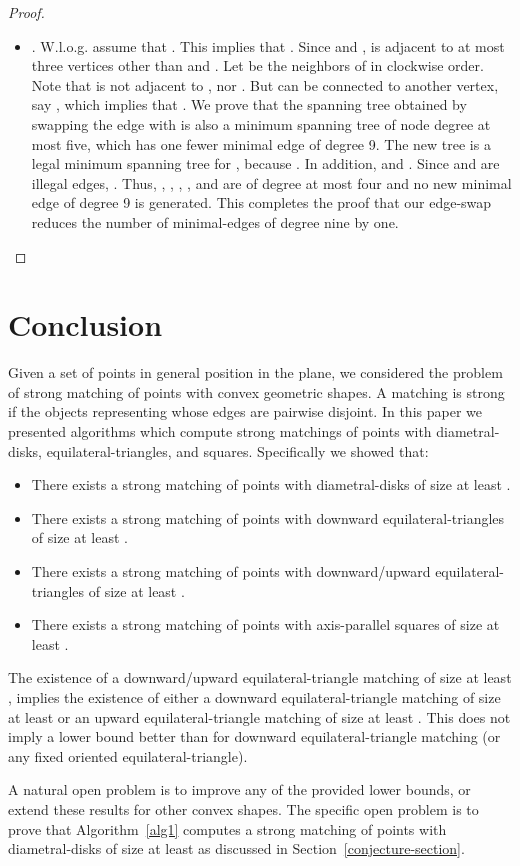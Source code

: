 \documentclass[11pt,a4paper]{article}
\begin{document}
\begin{proof}
\begin{itemize}
  \item . W.l.o.g. assume that . This implies that . Since  and ,  is adjacent to at most three vertices other than  and . Let  be the neighbors of  in clockwise order. Note that  is not adjacent to ,  nor . But  can be connected to another vertex, say , which implies that . We prove that the spanning tree obtained by swapping the edge  with  is also a minimum spanning tree of node degree at most five, which has one fewer minimal edge of degree 9. The new tree is a legal minimum spanning tree for , because . In addition,  and . Since  and  are illegal edges, . Thus, , , , , and  are of degree at most four and no new minimal edge of degree 9 is generated. This completes the proof that our edge-swap reduces the number of minimal-edges of degree nine by one.
\end{itemize}
\end{proof}

\section{Conclusion}
\label{conclusion}

Given a set of  points in general position in the plane, we considered the problem of strong matching of points with convex geometric shapes. A matching is strong if the objects representing whose edges are pairwise disjoint. In this paper we presented algorithms which compute strong matchings of points with diametral-disks, equilateral-triangles, and squares. Specifically we showed that:
\begin{itemize}
 \item There exists a strong matching of points with diametral-disks of size at least .
 \item There exists a strong matching of points with downward equilateral-triangles of size at least .
\item There exists a strong matching of points with downward/upward equilateral-triangles of size at least .
\item There exists a strong matching of points with axis-parallel squares of size at least .
\end{itemize}
 
The existence of a downward/upward equilateral-triangle matching of size at least , implies the existence of either a downward equilateral-triangle matching of size at least  or an upward equilateral-triangle matching of size at least . This does not imply a lower bound better than  for downward equilateral-triangle matching (or any fixed oriented equilateral-triangle).

A natural open problem is to improve any of the provided lower bounds, or extend these results for other convex shapes. The specific open problem is to prove that Algorithm~\ref{alg1} computes a strong matching of points with diametral-disks of size at least  as discussed in Section~\ref{conjecture-section}.


\end{document}
